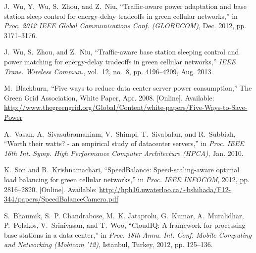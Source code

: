 \documentclass[conference]{IEEEtran}
\begin{document}
\begin{thebibliography}{10}
J.~Wu, Y.~Wu, S.~Zhou, and Z.~Niu, ``Traffic-aware power adaptation and base
  station sleep control for energy-delay tradeoffs in green cellular
  networks,'' in \emph{Proc. 2012 IEEE Global Communications Conf. (GLOBECOM)},
  Dec. 2012, pp. 3171--3176.

J.~Wu, S.~Zhou, and Z.~Niu, ``Traffic-aware base station sleeping control and
  power matching for energy-delay tradeoffs in green cellular networks,''
  \emph{{IEEE} Trans. Wireless Commun.}, vol.~12, no.~8, pp. 4196--4209, Aug.
  2013.

\BIBentryALTinterwordspacing
M.~Blackburn, ``Five ways to reduce data center server power consumption,'' The
  Green Grid Association, White Paper, Apr. 2008. [Online]. Available:
  \url{http://www.thegreengrid.org/Global/Content/white-papers/Five-Ways-to-Save-Power}
\BIBentrySTDinterwordspacing

A.~Vasan, A.~Sivasubramaniam, V.~Shimpi, T.~Sivabalan, and R.~Subbiah, ``Worth
  their watts? - an empirical study of datacenter servers,'' in \emph{Proc.
  IEEE 16th Int. Symp. High Performance Computer Architecture (HPCA)}, Jan.
  2010.

\BIBentryALTinterwordspacing
K.~Son and B.~Krishnamachari, ``{S}peed{B}alance: Speed-scaling-aware optimal
  load balancing for green cellular networks,'' in \emph{Proc. IEEE INFOCOM},
  2012, pp. 2816--2820. [Online]. Available:
  \url{http://hph16.uwaterloo.ca/~bshihada/F12-344/papers/SpeedBalanceCamera.pdf}
\BIBentrySTDinterwordspacing

S.~Bhaumik, S.~P. Chandrabose, M.~K. Jataprolu, G.~Kumar, A.~Muralidhar,
  P.~Polakos, V.~Srinivasan, and T.~Woo, ``{C}loud{IQ}: A framework for
  processing base stations in a data center,'' in \emph{Proc. 18th Annu. Int.
  Conf. Mobile Computing and Networking (Mobicom '12)}, Istanbul, Turkey,
  2012, pp. 125--136.

\end{thebibliography}
\end{document}
